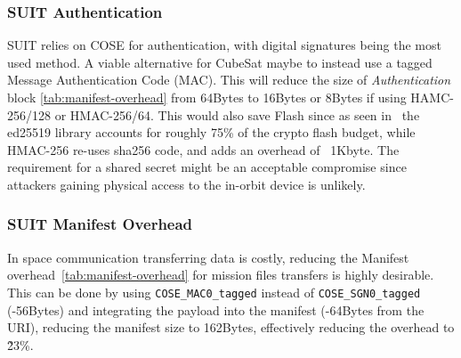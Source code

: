 \subsubsection{SUIT Authentication}

SUIT relies on COSE for authentication, with digital signatures being the most
used method. A viable alternative for CubeSat maybe to instead use a tagged Message
Authentication Code (MAC). This will reduce the size of \textit{Authentication} block
\ref*{tab:manifest-overhead} from 64Bytes to 16Bytes or 8Bytes if using HAMC-256/128
or HMAC-256/64. This would also save Flash since as seen in~\cite{zandberg2019secure}
the ed25519 library accounts for roughly 75\% of the crypto flash budget, while HMAC-256
re-uses sha256 code, and adds an overhead of ~1Kbyte. The requirement for a shared secret
might be an acceptable compromise since attackers gaining physical access to the
in-orbit device is unlikely.

\subsubsection{SUIT Manifest Overhead}

In space communication transferring data is costly, reducing the Manifest
overhead~\ref{tab:manifest-overhead} for mission files transfers is highly
desirable. This can be done by using \texttt{COSE\_MAC0\_tagged} instead of
\texttt{COSE\_SGN0\_tagged} (-56Bytes) and integrating the payload into the
manifest (-64Bytes from the URI), reducing the manifest size to 162Bytes,
effectively reducing the overhead to \~23\%.

